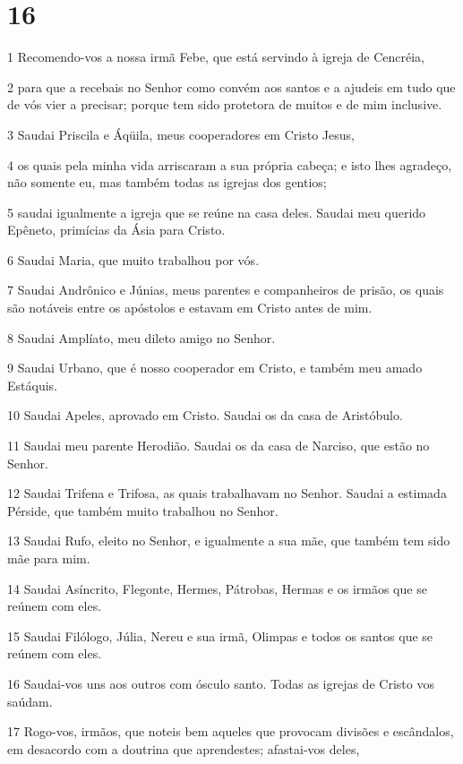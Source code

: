 \chapter{16}

\par 1 Recomendo-vos a nossa irmã Febe, que está servindo à igreja de Cencréia,
\par 2 para que a recebais no Senhor como convém aos santos e a ajudeis em tudo que de vós vier a precisar; porque tem sido protetora de muitos e de mim inclusive.
\par 3 Saudai Priscila e Áqüila, meus cooperadores em Cristo Jesus,
\par 4 os quais pela minha vida arriscaram a sua própria cabeça; e isto lhes agradeço, não somente eu, mas também todas as igrejas dos gentios;
\par 5 saudai igualmente a igreja que se reúne na casa deles. Saudai meu querido Epêneto, primícias da Ásia para Cristo.
\par 6 Saudai Maria, que muito trabalhou por vós.
\par 7 Saudai Andrônico e Júnias, meus parentes e companheiros de prisão, os quais são notáveis entre os apóstolos e estavam em Cristo antes de mim.
\par 8 Saudai Amplíato, meu dileto amigo no Senhor.
\par 9 Saudai Urbano, que é nosso cooperador em Cristo, e também meu amado Estáquis.
\par 10 Saudai Apeles, aprovado em Cristo. Saudai os da casa de Aristóbulo.
\par 11 Saudai meu parente Herodião. Saudai os da casa de Narciso, que estão no Senhor.
\par 12 Saudai Trifena e Trifosa, as quais trabalhavam no Senhor. Saudai a estimada Pérside, que também muito trabalhou no Senhor.
\par 13 Saudai Rufo, eleito no Senhor, e igualmente a sua mãe, que também tem sido mãe para mim.
\par 14 Saudai Asíncrito, Flegonte, Hermes, Pátrobas, Hermas e os irmãos que se reúnem com eles.
\par 15 Saudai Filólogo, Júlia, Nereu e sua irmã, Olimpas e todos os santos que se reúnem com eles.
\par 16 Saudai-vos uns aos outros com ósculo santo. Todas as igrejas de Cristo vos saúdam.
\par 17 Rogo-vos, irmãos, que noteis bem aqueles que provocam divisões e escândalos, em desacordo com a doutrina que aprendestes; afastai-vos deles,
